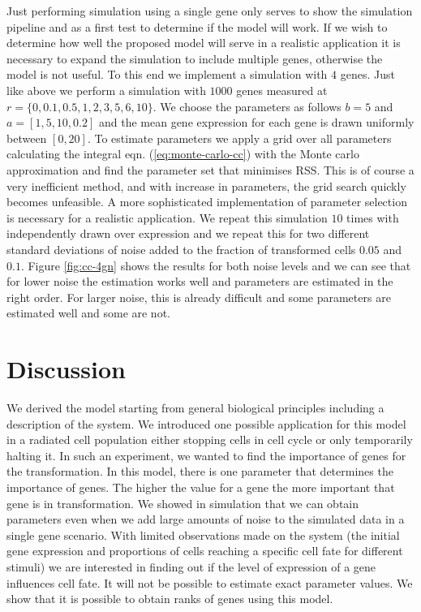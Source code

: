 Just performing simulation using a single gene only serves to show the simulation pipeline and as a first test to determine if the model will work. If we wish to determine how well the proposed model will serve in a realistic application it is necessary to expand the simulation to include multiple genes, otherwise the model is not useful. To this end we implement a simulation with $4$ genes. Just like above we perform a simulation with $1000$ genes measured at $r =\lbrace 0, 0.1, 0.5, 1, 2, 3, 5, 6, 10 \rbrace$. We choose the parameters as follows $b=5$ and $a=[1, 5, 10, 0.2]$ and the mean gene expression for each gene is drawn uniformly between $[0, 20]$. To estimate parameters we apply a grid over all parameters calculating the integral eqn. (\ref{eq:monte-carlo-cc}) with the Monte carlo approximation and find the parameter set that minimises RSS. This is of course a very inefficient  method,  and with increase in parameters, the grid search quickly becomes unfeasible. A more sophisticated implementation of parameter selection is necessary for a realistic application.  We repeat this simulation $10$ times with independently drawn over expression and we repeat this for two different standard deviations of noise added to the fraction of transformed cells $0.05$ and $0.1$. Figure \ref{fig:cc-4gn} shows the results for both noise levels and we can see that for lower noise the estimation works well and parameters are estimated in the right order. For larger noise, this is already difficult and some parameters are estimated well and some are not.



\section{Discussion}
\label{sec:discussion-cc}

We derived the model starting from general biological principles including a description of the system. We introduced one possible application for this model in a radiated cell population either stopping cells in cell cycle or only temporarily halting it. In such an experiment, we wanted to find the importance of genes for the transformation.  In this model, there is one parameter that determines the importance of genes. The higher the value for a gene the more important that gene is in transformation. We showed in simulation that we can obtain parameters even when we add large amounts of noise to the simulated data in a single gene scenario. With limited observations made on the system (the initial gene expression and proportions of cells reaching a specific cell fate for different stimuli) we are interested in finding out if the level of expression of a gene influences cell fate. It will not be possible to estimate exact parameter values. We show that it is possible to obtain ranks of genes using this model.

